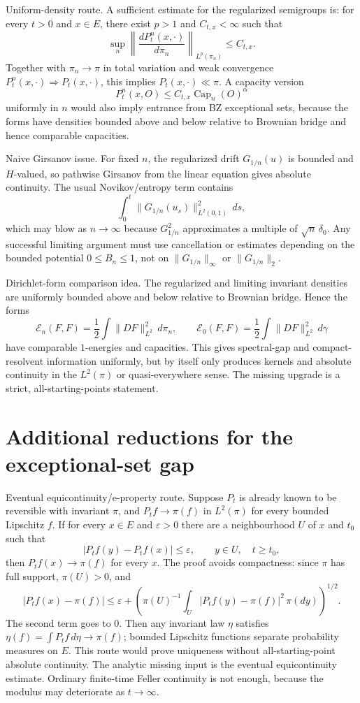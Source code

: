 \documentclass[12pt]{article}
\begin{document}
Uniform-density route.  A sufficient estimate for the regularized
semigroups is: for every $t>0$ and $x\in E$, there exist $p>1$ and
$C_{t,x}<\infty$ such that
\[
  \sup_n \left\|
    \frac{dP_t^n(x,\cdot)}{d\pi_n}
  \right\|_{L^p(\pi_n)}\le C_{t,x}.
\]
Together with $\pi_n\to\pi$ in total variation and weak convergence
$P_t^n(x,\cdot)\Rightarrow P_t(x,\cdot)$, this implies
$P_t(x,\cdot)\ll\pi$.  A capacity version
\[
  P_t^n(x,O)\le C_{t,x}\operatorname{Cap}_n(O)^\alpha
\]
uniformly in $n$ would also imply entrance from BZ exceptional sets,
because the forms have densities bounded above and below relative to
Brownian bridge and hence comparable capacities.

Naive Girsanov issue.  For fixed $n$, the regularized drift
$G_{1/n}(u)$ is bounded and $H$-valued, so pathwise Girsanov from the
linear equation gives absolute continuity.  The usual Novikov/entropy
term contains
\[
  \int_0^t\|G_{1/n}(u_s)\|_{L^2(0,1)}^2\,ds,
\]
which may blow as $n\to\infty$ because $G_{1/n}^2$ approximates a
multiple of $\sqrt n\,\delta_0$.  Any successful limiting argument must
use cancellation or estimates depending on the bounded potential
$0\le B_n\le1$, not on $\|G_{1/n}\|_\infty$ or $\|G_{1/n}\|_2$.

Dirichlet-form comparison idea.  The regularized and limiting invariant
densities are uniformly bounded above and below relative to Brownian
bridge.  Hence the forms
\[
  \mathcal E_n(F,F)=\frac12\int\|DF\|_{L^2}^2\,d\pi_n,\qquad
  \mathcal E_0(F,F)=\frac12\int\|DF\|_{L^2}^2\,d\gamma
\]
have comparable $1$-energies and capacities.  This gives spectral-gap
and compact-resolvent information uniformly, but by itself only produces
kernels and absolute continuity in the $L^2(\pi)$ or quasi-everywhere
sense.  The missing upgrade is a strict, all-starting-points statement.



\section*{Additional reductions for the exceptional-set gap}

Eventual equicontinuity/e-property route.  Suppose $P_t$ is already known
to be reversible with invariant $\pi$, and $P_t f\to\pi(f)$ in
$L^2(\pi)$ for every bounded Lipschitz $f$.  If for every $x\in E$ and
$\varepsilon>0$ there are a neighbourhood $U$ of $x$ and $t_0$ such that
\[
  |P_t f(y)-P_t f(x)|\le \varepsilon,\qquad y\in U,\quad t\ge t_0,
\]
then $P_t f(x)\to\pi(f)$ for every $x$.  The proof avoids compactness:
since $\pi$ has full support, $\pi(U)>0$, and
\[
 |P_t f(x)-\pi(f)|
 \le \varepsilon+
 \left(\pi(U)^{-1}\int_U |P_t f(y)-\pi(f)|^2\,\pi(dy)\right)^{1/2}.
\]
The second term goes to $0$.  Then any invariant law $\eta$ satisfies
$\eta(f)=\int P_t f\,d\eta\to\pi(f)$; bounded Lipschitz functions
separate probability measures on $E$.  This route would prove uniqueness
without all-starting-point absolute continuity.  The analytic missing
input is the eventual equicontinuity estimate.  Ordinary finite-time
Feller continuity is not enough, because the modulus may deteriorate as
$t\to\infty$.
\end{document}

